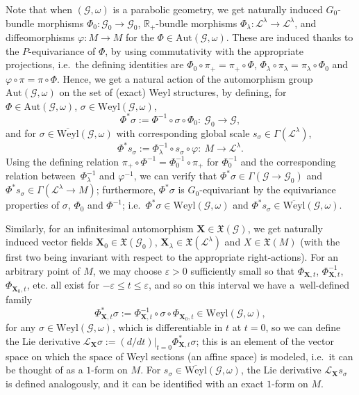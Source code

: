\documentclass[11pt]{article}
\def\R{\mathbb{R}}
\def\Gbdle{\mathcal{G}}
\def\VF{\mathfrak{X}}
\theoremstyle{plain}
\theoremstyle{definition}
\begin{document}
Note that when $(\Gbdle,\omega)$ is a parabolic geometry, we get naturally induced $G_0$-bundle morphisms $\Phi_0:\Gbdle_0 \rightarrow \Gbdle_0$, $\R_+$-bundle morphisms $\Phi_{\lambda}: \mathcal{L}^{\lambda} \rightarrow \mathcal{L}^{\lambda}$, and dif\/feomorphisms $\varphi: M \rightarrow M$ for the $\Phi \in \mathrm{Aut}(\Gbdle,\omega)$. These are induced thanks to the $P$-equivariance of $\Phi$, by using commutativity with the appropriate projections, i.e.\ the def\/ining identities are $\Phi_0 \circ \pi_+ = \pi_+ \circ \Phi$, $\Phi_{\lambda} \circ \pi_{\lambda} = \pi_{\lambda} \circ \Phi_0$  and $\varphi \circ \pi = \pi \circ \Phi$. Hence, we get a natural action of the automorphism group $\mathrm{Aut}(\Gbdle,\omega)$ on the set of (exact) Weyl structures, by def\/ining, for $\Phi \in \mathrm{Aut}(\Gbdle,\omega)$, $\sigma \in \mathrm{Weyl}(\Gbdle,\omega)$,
\[
\Phi^*\sigma := \Phi^{-1} \circ \sigma \circ \Phi_0: \ \Gbdle_0 \rightarrow \Gbdle,
\]
and for $\sigma \in \overline{\mathrm{Weyl}}(\Gbdle,\omega)$ with corresponding global scale $s_{\sigma} \in \Gamma(\mathcal{L}^{\lambda})$,
\[
\Phi^*s_{\sigma} := \Phi_{\lambda}^{-1} \circ s_{\sigma} \circ \varphi: \ M \rightarrow \mathcal{L}^{\lambda}.
\]
Using the def\/ining relation $\pi_+ \circ \Phi^{-1} = \Phi_0^{-1} \circ \pi_+$ for $\Phi_0^{-1}$ and the corresponding relation bet\-ween~$\Phi_{\lambda}^{-1}$ and $\varphi^{-1}$, we can verify that $\Phi^*\sigma \in \Gamma(\Gbdle \rightarrow \Gbdle_0)$ and $\Phi^*s_{\sigma} \in \Gamma(\mathcal{L}^{\lambda} \rightarrow M)$; furthermore, $\Phi^*\sigma$ is $G_0$-equivariant by the equivariance properties of $\sigma$, $\Phi_0$ and $\Phi^{-1}$; i.e.\ $\Phi^*\sigma \in \mathrm{Weyl}(\Gbdle,\omega)$ and $\Phi^*s_{\sigma} \in \overline{\mathrm{Weyl}}(\Gbdle,\omega)$.

Similarly, for an inf\/initesimal automorphism $\mathbf{X} \in \VF(\Gbdle)$, we get naturally induced vector f\/ields $\mathbf{X}_0 \in \VF(\Gbdle_0)$, $\mathbf{X}_{\lambda} \in \VF(\mathcal{L}^{\lambda})$ and $X \in \VF(M)$ (with the f\/irst two being invariant with respect to the appropriate right-actions). For an arbitrary point of $M$, we may choose $\varepsilon > 0$ suf\/f\/iciently small so that $\Phi_{\mathbf{X},t}$, $\Phi_{\mathbf{X},t}^{-1}$, $\Phi_{\mathbf{X}_0,t}$, etc. all exist for $-\varepsilon \leq t \leq \varepsilon$, and so on this interval we have a~well-def\/ined family
\[
\Phi_{\mathbf{X},t}^*\sigma := \Phi_{\mathbf{X},t}^{-1} \circ \sigma \circ \Phi_{\mathbf{X}_0,t} \in \mathrm{Weyl}(\Gbdle,\omega),
\]
for any $\sigma \in \mathrm{Weyl}(\Gbdle,\omega)$, which is dif\/ferentiable in $t$ at $t=0$, so we can def\/ine the Lie derivative $\mathcal{L}_{\mathbf{X}} \sigma := (d/dt)\vert_{t=0}\Phi_{\mathbf{X},t}^*\sigma$; this is an element of the vector space on which the space of Weyl sections (an af\/f\/ine space) is modeled, i.e.\ it can be thought of as a $1$-form on $M$. For $s_{\sigma} \in \overline{\mathrm{Weyl}}(\Gbdle,\omega)$, the Lie derivative $\mathcal{L}_{\mathbf{X}}s_{\sigma}$ is def\/ined analogously, and it can be identif\/ied with an exact $1$-form on $M$.
\end{document}
